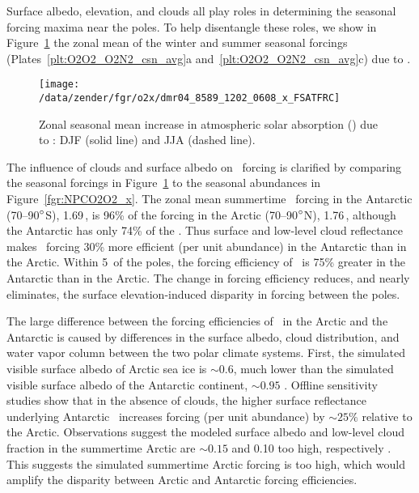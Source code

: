 \documentclass[agupp,twoside]{aguplus} %
\newlength{\fltwdtsngclm}\setlength{\fltwdtsngclm}{20.0pc} %
\begin{document}
Surface albedo, elevation, and clouds all play roles in determining
the seasonal forcing maxima near the poles. 
To help disentangle these roles, we show in Figure~\ref{fgr:FSATFRC_x}
the zonal mean of the winter and summer seasonal forcings
(Plates~\ref{plt:O2O2_O2N2_csn_avg}a
and~\ref{plt:O2O2_O2N2_csn_avg}c) due to \OdX.   
\begin{figure}
\begin{center}
\texttt{[image: /data/zender/fgr/o2x/dmr04\_8589\_1202\_0608\_x\_FSATFRC]}\vfill
\end{center}
\caption{
Zonal seasonal mean increase in atmospheric solar absorption (\wxmS)
due to \OdX: DJF (solid line) and JJA (dashed line).  
\label{fgr:FSATFRC_x}}
\end{figure}
The influence of clouds and surface albedo on \OdX\ forcing is
clarified by comparing the seasonal forcings in
Figure~\ref{fgr:FSATFRC_x} to the seasonal abundances in
Figure~\ref{fgr:NPCO2O2_x}.  
The zonal mean summertime \OdX\ forcing in the Antarctic
(70--90$^{\circ}$S), 1.69\,\wxmS, is 96\% of the forcing in the Arctic
(70--90$^{\circ}$N), 1.76\,\wxmS, although the Antarctic has only 74\%
of the \OdX. 
Thus surface and low-level cloud reflectance makes \OdX\ forcing 30\%
more efficient (per unit abundance) in the Antarctic than in the
Arctic.  
Within 5\dgr\ of the poles, the forcing efficiency of \OdX\ is 
75\% greater in the Antarctic than in the Arctic.
The change in forcing efficiency reduces, and nearly eliminates, the
surface elevation-induced disparity in forcing between the poles.

The large difference between the forcing efficiencies of \OdX\ in the 
Arctic and the Antarctic is caused by differences in the surface
albedo, cloud distribution, and water vapor column between the two
polar climate systems. 
First, the simulated visible surface albedo of Arctic sea ice is $\sim 
0.6$, much lower than the simulated visible surface albedo of the
Antarctic continent, $\sim 0.95$ \cite[]{BrB981}.   
Offline sensitivity studies show that in the absence of clouds, the
higher surface reflectance underlying Antarctic \OdX\ increases
forcing (per unit abundance) by $\sim 25\%$ relative to the Arctic.  
Observations suggest the modeled surface albedo and low-level cloud
fraction in the summertime Arctic are $\sim 0.15$ and 0.10 too high,
respectively \cite[]{BrB981}.   
This suggests the simulated summertime Arctic forcing is too high,
which would amplify the disparity between Arctic and Antarctic forcing
efficiencies. 
\end{document}
